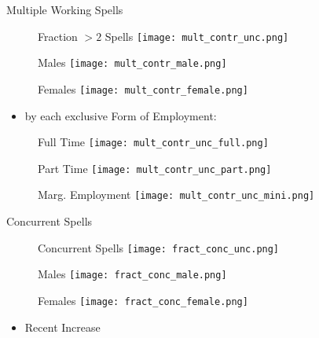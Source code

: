 \documentclass[hyperref={bookmarks=false}]{beamer}
\begin{document}
\begin{appendix}
\begin{frame}{Multiple Working Spells}
\begin{figure}[!t]
\centering
\begin{minipage}[b]{0.3\textwidth}{Fraction $>2$ Spells}
\centering
\texttt{[image: mult\_contr\_unc.png]}
\end{minipage}
\begin{minipage}[b]{0.3\textwidth}{Males}
\centering
\texttt{[image: mult\_contr\_male.png]}
\end{minipage}
\begin{minipage}[b]{0.3\textwidth}{Females}
\centering
\texttt{[image: mult\_contr\_female.png]}
\end{minipage}
\end{figure}
\begin{itemize}
\item  by each exclusive Form of Employment:
\end{itemize}
\begin{figure}[!t]
\begin{minipage}[b]{0.3\textwidth}{Full Time}
\centering
\texttt{[image: mult\_contr\_unc\_full.png]}
\end{minipage}
\begin{minipage}[b]{0.3\textwidth}{Part Time}
\centering
\texttt{[image: mult\_contr\_unc\_part.png]}
\end{minipage}
\begin{minipage}[b]{0.3\textwidth}{Marg. Employment}
\centering
\texttt{[image: mult\_contr\_unc\_mini.png]}
\end{minipage}
\end{figure}
\end{frame}

\begin{frame}{Concurrent Spells}
\begin{figure}[!t]
\centering
\begin{minipage}[b]{0.3\textwidth}{Concurrent Spells}
\centering
\texttt{[image: fract\_conc\_unc.png]}
\end{minipage}
\begin{minipage}[b]{0.3\textwidth}{Males}
\centering
\texttt{[image: fract\_conc\_male.png]}
\end{minipage}
\begin{minipage}[b]{0.3\textwidth}{Females}
\centering
\texttt{[image: fract\_conc\_female.png]}
\end{minipage}
\end{figure}
\begin{itemize}
\item  Recent Increase
\end{itemize}
\hyperlink{DATA}{}
\end{frame}


\end{appendix}
\end{document}
